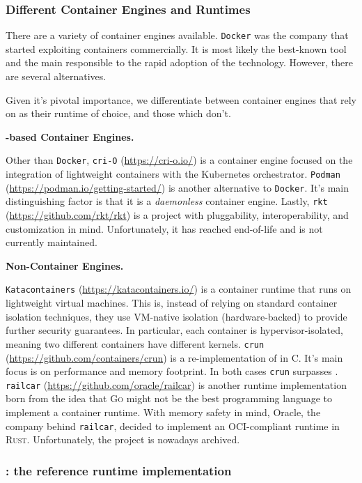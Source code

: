 \subsubsection*{Different Container Engines and Runtimes}

There are a variety of container engines available.
\texttt{Docker} was the company that started exploiting containers commercially.
It is most likely the best-known tool and the main responsible to the rapid adoption of the technology.
However, there are several alternatives.

Given it's pivotal importance, we differentiate between container engines that rely on \runc as their runtime of choice, and those which don't.

\textbf{\runc-based Container Engines.}

Other than \texttt{Docker}, \texttt{cri-O} (\url{https://cri-o.io/}) is a container engine focused on the integration of lightweight containers with the Kubernetes orchestrator.
\texttt{Podman} (\url{https://podman.io/getting-started/}) is another alternative to \texttt{Docker}.
It's main distinguishing factor is that it is a \textit{daemonless} container engine.
Lastly, \texttt{rkt} (\url{https://github.com/rkt/rkt}) is a project with pluggability, interoperability, and customization in mind.
Unfortunately, it has reached end-of-life and is not currently maintained.

\textbf{Non-\runc Container Engines.}

\texttt{Katacontainers} (\url{https://katacontainers.io/}) is a container runtime that runs on lightweight virtual machines.
This is, instead of relying on standard container isolation techniques, they use VM-native isolation (hardware-backed) to provide further security guarantees.
In particular, each container is hypervisor-isolated, meaning two different containers have different kernels.
\texttt{crun} (\url{https://github.com/containers/crun}) is a re-implementation of \runc in C.
It's main focus is on performance and memory footprint.
In both cases \texttt{crun} surpasses \runc.
\texttt{railcar} (\url{https://github.com/oracle/railcar}) is another runtime implementation born from the idea that \textsc{Go} might not be the best programming language to implement a container runtime.
With memory safety in mind, Oracle, the company behind \texttt{railcar}, decided to implement an OCI-compliant runtime in \textsc{Rust}.
Unfortunately, the project is nowadays archived.

\subsubsection*{\runc: the reference runtime implementation}

